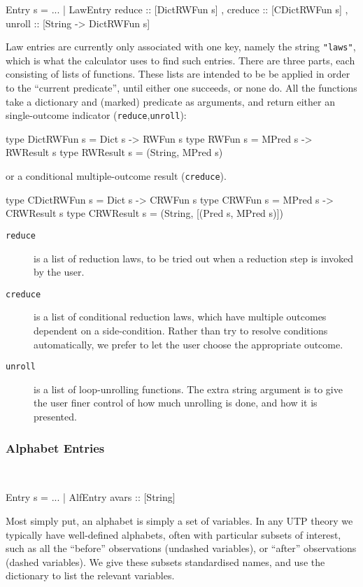 \begin{code}
Entry s
  = ...
  | LawEntry  { reduce :: [DictRWFun s]
              , creduce :: [CDictRWFun s]
              , unroll :: [String -> DictRWFun s] }
\end{code}
Law entries are currently only associated with one key,
namely the string \texttt{"laws"},
which is what the calculator uses to find such entries.
There are three parts,
each consisting of lists of functions.
These lists are intended to be be applied in order to the
``current predicate'', until either one succeeds,
or none do.
All the functions take a dictionary
and (marked) predicate as arguments,
and return either
an single-outcome indicator (\texttt{reduce},\texttt{unroll}):
\begin{code}
type DictRWFun s = Dict s -> RWFun s
type RWFun s = MPred s -> RWResult s
type RWResult s = (String, MPred s)
\end{code}
or a conditional  multiple-outcome result (\texttt{creduce}).
\begin{code}
type CDictRWFun s = Dict s -> CRWFun s
type CRWFun s = MPred s -> CRWResult s
type CRWResult s = (String, [(Pred s, MPred s)])
\end{code}
\begin{description}
  \item[\texttt{reduce}]
     is a list of reduction laws,
     to be tried out when a reduction step is invoked by the user.
  \item[\texttt{creduce}]
    is a list of conditional reduction laws,
    which have multiple outcomes dependent on a side-condition.
    Rather than try to resolve conditions automatically,
    we prefer to let the user choose the appropriate outcome.
  \item[\texttt{unroll}]
    is a list of loop-unrolling functions.
    The extra string argument is to give the user finer control
    of how much unrolling is done, and how it is presented.
\end{description}


\subsubsection{Alphabet Entries}~

\begin{code}
Entry s
  = ...
  | AlfEntry  { avars :: [String]}
\end{code}
Most simply put, an alphabet is simply a set of variables.
In any UTP theory we typically have well-defined alphabets,
often with particular subsets of interest,
such as all the ``before'' observations (undashed variables),
or ``after'' observations (dashed variables).
We give these subsets standardised names,
and use the dictionary to list the relevant variables.


